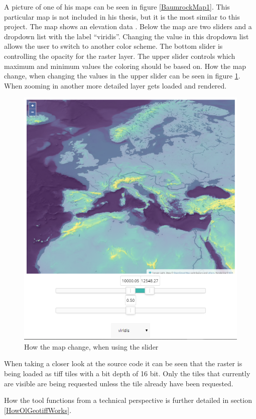 A picture of one of his maps can be seen in figure \ref{BaumrockMap1}. This particular map is not included in his thesis, but it is the most similar to this project. The map shows an elevation data . Below the map are two sliders and a dropdown list with the label “viridis”. Changing the value in this dropdown list allows the user to switch to another color scheme. The bottom slider is controlling the opacity for the raster layer. The upper slider controls which maximum and minimum values the coloring should be based on. How the map change, when changing the values in the upper slider can be seen in figure \ref{BaumrockMap2}. When zooming in another more detailed layer gets loaded and rendered.
\begin{figure} [H]
	\centering
	\includegraphics[width=.6\textwidth]{Pictures/BaumrockMap2}
	\caption{How the map change, when using the slider}
	\label{BaumrockMap2}
\end{figure}

When taking a closer look at the source code it can be seen that the raster is being loaded as tiff tiles with a bit depth of 16 bit. \citep{EOX} Only the tiles that currently are visible are being requested unless the tile already have been requested. \citep{Baumrocks}

How the tool functions from a technical perspective is further detailed in section \ref{HowOlGeotiffWorks}.

